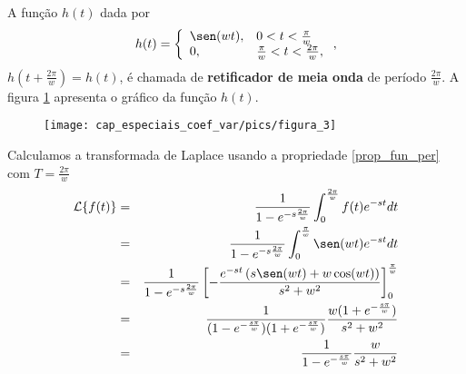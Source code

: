 \begin{ex} A função $h(t)$ dada por
\begin{equation}
h(t)=\left\{\begin{array}{ll}\sen(wt),&0<t<\frac{\pi}{w}\\0,& \frac{\pi}{w}<t<\frac{2\pi}{w}, \end{array}\right.,
\end{equation}
$h\left(t+\frac{2\pi}{w}\right)=h(t)$, é chamada de {\bf retificador de meia onda} de período $\frac{2\pi}{w}$. A figura \ref{fig_ret_meia_onda} apresenta o gráfico da função $h(t)$.
 \begin{figure}[!ht]
\begin{center}

\texttt{[image: cap\_especiais\_coef\_var/pics/figura\_3]}\end{center}
\caption{\label{fig_ret_meia_onda}}
\end{figure}
Calculamos a transformada de Laplace usando a propriedade \ref{prop_fun_per} com $T=\frac{2\pi}{w}$
\begin{eqnarray*}
\mathcal{L}\{f(t)\}&=& \frac{1}{1-e^{-s\frac{2\pi}{w}}}\int_0^{\frac{2\pi}{w}}f(t)e^{-st}dt\\
&=& \frac{1}{1-e^{-s\frac{2\pi}{w}}} \int_0^{\frac{\pi}{w}}\sen(wt)e^{-st}dt\\
&=& \frac{1}{1-e^{-s\frac{2\pi}{w}}} \left[-\frac{e^{-st}\left(s\sen(wt)+w\cos(wt)\right)}{s^2+w^2}\right]_0^{\frac{\pi}{w}}\\
&=& \frac{1}{(1-e^{-\frac{s\pi}{w}})(1+e^{-\frac{s\pi}{w}})} \frac{w(1+e^{-\frac{s\pi}{w}})}{s^2+w^2}\\
&=& \frac{1}{1-e^{-\frac{s\pi}{w}}} \frac{w}{s^2+w^2}
\end{eqnarray*}
\end{ex}

